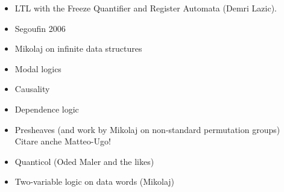 \begin{itemize}
 \item LTL with the Freeze Quantifier and Register Automata (Demri Lazic).
 \item Segoufin 2006
 \item Mikolaj on infinite data structures
 \item Modal logics
 \item Causality
 \item Dependence logic
 \item Presheaves (and work by Mikolaj on non-standard permutation groups) Citare anche Matteo-Ugo!
 \item Quanticol (Oded Maler and the likes)
 \item Two-variable logic on data words (Mikolaj)
\end{itemize}


